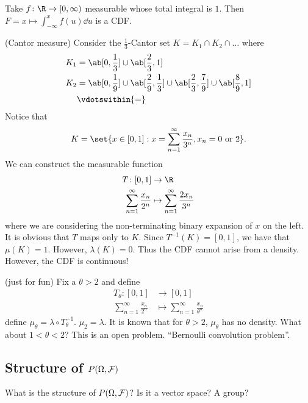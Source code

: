 \begin{examples}
    \item Take $f\colon \R \to [0, \infty)$ measurable whose total integral
        is $1$. Then $F = x \mapsto \int_{-\infty}^x f(u) \dd u$ is a CDF.
    \item (Cantor measure) Consider the $\frac13$-Cantor set
        $K = K_1 \cap K_2 \cap \dots$ where
        \begin{align*}
            K_1 &= \ab[0, \frac13] \cup \ab[\frac23, 1] \\
            K_2 &= \ab[0, \frac19] \cup \ab[\frac29, \frac13]
                \cup \ab[\frac23, \frac79] \cup \ab[\frac89, 1] \\
            &\vdotswithin{=}
        \end{align*}
        Notice that \[
            K = \set{x \in [0, 1] : x = \sum_{n=1}^\infty \frac{x_n}{3^n},
                                    x_n = 0 \text{ or } 2}.
        \]
        We can construct the measurable function \begin{align*}
            T\colon [0, 1] &\to \R \\
            \sum_{n=1}^\infty \frac{x_n}{2^n}
                &\mapsto \sum_{n=1}^\infty \frac{2x_n}{3^n}
        \end{align*} where we are considering the non-terminating binary
        expansion of $x$ on the left.
        It is obvious that $T$ maps only to $K$.
        Since $T^{-1}(K) = [0, 1]$, we have that $\mu(K) = 1$.
        However, $\lambda(K) = 0$.
        Thus the CDF cannot arise from a density.
        However, the CDF is continuous! %
    \item (just for fun) Fix a $\theta > 2$ and define \begin{align*}
            T_\theta\colon [0, 1] &\to [0, 1] \\
            \sum_{n=1}^\infty \frac{x_n}{2^n}
                &\mapsto \sum_{n=1}^\infty \frac{x_n}{\theta^n}
        \end{align*}
        define $\mu_\theta = \lambda \circ T_\theta^{-1}$.
        $\mu_2 = \lambda$.
        It is known that for $\theta > 2$, $\mu_\theta$ has no density.
        What about $1 < \theta < 2$?
        This is an open problem.
        ``Bernoulli convolution problem''.
\end{examples}

\subsection{Structure of $P(\Omega, \mathcal F)$} \label{sec:structure-measures}
What is the structure of $P(\Omega, \mathcal F)$?
Is it a vector space? A group?

